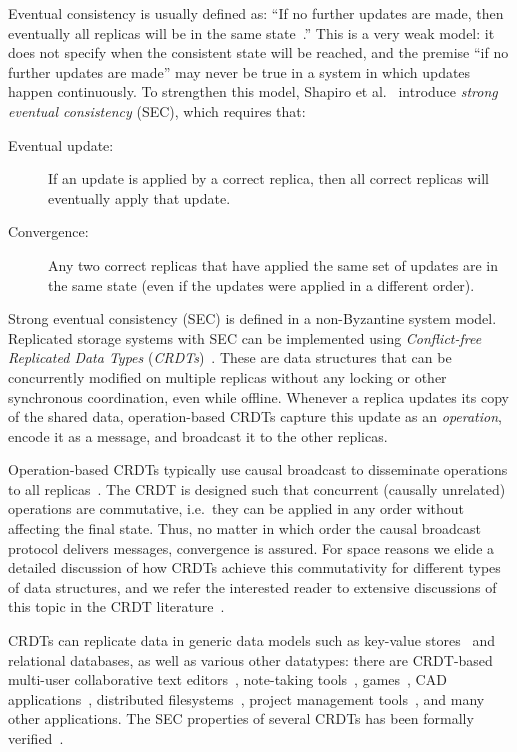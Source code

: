 \documentclass[a4paper,anonymous,USenglish]{lipics-v2019}
\begin{document}
Eventual consistency is usually defined as: ``If no further updates are made, then eventually all replicas will be in the same state~\cite{Vogels:2009ca}.''
This is a very weak model: it does not specify when the consistent state will be reached, and the premise ``if no further updates are made'' may never be true in a system in which updates happen continuously.
To strengthen this model, Shapiro et al.~\cite{Shapiro:2011} introduce \emph{strong eventual consistency} (SEC), which requires that:

\begin{description}
\item[Eventual update:] If an update is applied by a correct replica, then all correct replicas will eventually apply that update.
\item[Convergence:] Any two correct replicas that have applied the same set of updates are in the same state (even if the updates were applied in a different order).
\end{description}

Strong eventual consistency (SEC) is defined in a non-Byzantine system model.
Replicated storage systems with SEC can be implemented using \emph{Conflict-free Replicated Data Types} (\emph{CRDTs})~\cite{Shapiro:2011}.
These are data structures that can be concurrently modified on multiple replicas without any locking or other synchronous coordination, even while offline.
Whenever a replica updates its copy of the shared data, operation-based CRDTs capture this update as an \emph{operation}, encode it as a message, and broadcast it to the other replicas.

Operation-based CRDTs typically use causal broadcast to disseminate operations to all replicas~\cite{Gomes:2017gy,Shapiro:2011}.
The CRDT is designed such that concurrent (causally unrelated) operations are commutative, i.e.\ they can be applied in any order without affecting the final state.
Thus, no matter in which order the causal broadcast protocol delivers messages, convergence is assured.
For space reasons we elide a detailed discussion of how CRDTs achieve this commutativity for different types of data structures, and we refer the interested reader to extensive discussions of this topic in the CRDT literature~\cite{Gomes:2017gy,Shapiro:2011wy,Weiss:2009ht}.

CRDTs can replicate data in generic data models such as key-value stores~\cite{Akkoorath2016Cure,Zawirski2015SwiftCloud} and relational databases, as well as various other datatypes: there are CRDT-based multi-user collaborative text editors~\cite{Weiss:2009ht}, note-taking tools~\cite{vanHardenberg2020PushPin}, games~\cite{vanderLinde:2017fu}, CAD applications~\cite{Lv:2018ie}, distributed filesystems~\cite{Najafzadeh:2018bw,Tao:2015gd}, project management tools~\cite{Kleppmann2019localfirst}, and many other applications.
The SEC properties of several CRDTs has been formally verified~\cite{Gomes:2017gy,Zeller:2014fl}.
\end{document}
